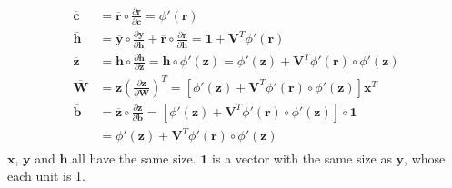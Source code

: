 \documentclass{myhw}
\begin{document}
\begin{homeworkProblem}
\begin{homeworkSection}
\begin{gather*}
\begin{aligned}
\overline{\textbf{c}} &= \overline{\textbf{r}} \circ \frac{\partial{\textbf{r}}}{\partial{\textbf{c}}} = \phi'(\textbf{r}) \\
\overline{\textbf{h}} &= \overline{\textbf{y}} \circ \frac{\partial\textbf{y}}{\partial\textbf{h}} + \overline{\textbf{r}} \circ \frac{\partial\textbf{r}}{\partial\textbf{h}} = \textbf{1} + \textbf{V}^T \phi'(\textbf{r}) \\
\overline{\textbf{z}} &= \overline{\textbf{h}} \circ \frac{\partial\textbf{h}}{\partial\textbf{z}} = \overline{\textbf{h}} \circ \phi'(\textbf{z}) = \phi'(\textbf{z}) + \textbf{V}^T \phi'(\textbf{r}) \circ \phi'(\textbf{z}) \\
\overline{\textbf{W}} &= \overline{\textbf{z}} (\frac{\partial\textbf{z}}{\partial\textbf{W}})^T = [\phi'(\textbf{z}) + \textbf{V}^T \phi'(\textbf{r}) \circ \phi'(\textbf{z})] \textbf{x}^T \\
\overline{\textbf{b}} &= \overline{\textbf{z}} \circ \frac{\partial\textbf{z}}{\partial\textbf{b}} = [\phi'(\textbf{z}) + \textbf{V}^T \phi'(\textbf{r}) \circ \phi'(\textbf{z})] \circ \textbf{1} \\
&= \phi'(\textbf{z}) + \textbf{V}^T \phi'(\textbf{r}) \circ \phi'(\textbf{z})
\end{aligned}
\end{gather*}
$\textbf{x}$, $\textbf{y}$ and $\textbf{h}$ all have the same size. $\textbf{1}$ is a vector with the same size as $\textbf{y}$, whose each unit is 1. 
\end{homeworkSection}
\end{homeworkProblem}
\end{document}
